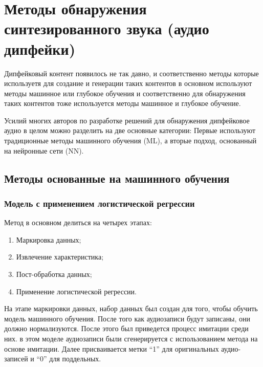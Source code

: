 
\section{Методы обнаружения синтезированного звука (аудио дипфейки)}

Дипфейковый контент появилось не так давно, и соответственно методы которые используетя для создание и генерации таких контентов в основном используют методы машинное или глубокое обучения и соответственно для обнаружения таких контентов тоже используется методы машинное и глубокое обучение.

Усилий многих авторов по разработке решений для обнаружения дипфейковое аудио в целом можно разделить на две основные категории: Первые используют традиционные методы машинного обучения (ML), а вторые подход, основанный на нейронные сети (NN).

\subsection{Методы основанные на машинного обучения}

\subsubsection{Модель с применением логистической регрессии}

Метод в основном делиться на четырех этапах:

\begin{enumerate}
    \item Маркировка данных;
    \item Извлечение характеристика;
    \item Пост-обработка данных;
    \item Применение логистической регрессии.
\end{enumerate}

На этапе маркировки данных, набор данных был создан для того, чтобы обучить модель машинного обучения. После того как аудиозаписи будут записаны, они должно нормализуются. После этого был приведется процесс имитации среди них. в этом моделе аудиозаписи были сгенерируется с использованием метода на основе имитации. Далее присваивается метки “1” для оригинальных аудио-записей и “0” для поддельных.

